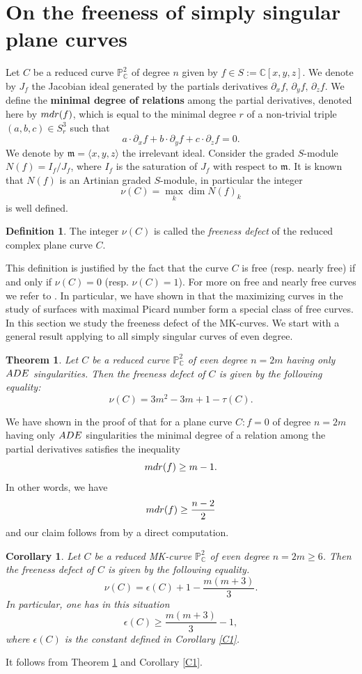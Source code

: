 \documentclass[11pt]{amsart}
\theoremstyle{plain}
\newtheorem{theorem}[thm]{Theorem}
\newtheorem{corollary}[thm]{Corollary}
\theoremstyle{definition}
\newtheorem{definition}[thm]{Definition}
\numberwithin{equation}{section}
\begin{document}
\section{On the freeness of simply singular plane curves}

 Let $C$ be a reduced curve $\mathbb{P}^{2}_{\mathbb{C}}$ of degree $n$ given by $f \in S :=\mathbb{C}[x,y,z]$. We denote by $J_{f}$ the Jacobian ideal generated by the partials derivatives $\partial_{x}f, \, \partial_{y}f, \, \partial_{z}f$. We define  the \textbf{minimal degree of relations} among the partial derivatives, denoted here by ${\rm mdr}(f)$, which is equal to the minimal degree $r$ of a non-trivial triple $(a,b,c) \in S_{r}^{3}$ such that 
$$a\cdot \partial_{x} f + b\cdot \partial_{y}f + c\cdot \partial_{z}f = 0.$$
We denote by $\mathfrak{m} = \langle x,y,z \rangle$ the irrelevant ideal. Consider the graded $S$-module $N(f) = I_{f} / J_{f}$, where $I_{f}$ is the saturation of $J_{f}$ with respect to $\mathfrak{m}$. It is known that $N(f)$ is an Artinian graded $S$-module, in particular the integer
$$\nu(C)=\max _k \dim N(f)_k$$
is well defined.
\begin{definition}
The integer $\nu(C)$ is called the {\it freeness defect} of the reduced complex plane curve $C$.
\end{definition}
This definition is justified by the fact that the curve $C$ is free (resp. nearly free) if and only if $\nu(C)=0$ (resp. $\nu(C)=1$). For more on free and nearly free curves we refer to \cite{DP,DimStic}. In particular, we have shown in  \cite[Theorem 2.9]{DP} that the maximizing curves in the study of surfaces with maximal Picard number form a special class of free curves.
In this section we study the freeness defect of the MK-curves. We start with a general result applying to all simply singular curves of even degree.
\begin{theorem}
\label{thmNU}
Let $C$ be a reduced curve $\mathbb{P}^{2}_{\mathbb{C}}$ of even degree $n=2m$ having only ${\rm ADE}$ singularities. Then the freeness defect of $C$ is given by the following equality:
$$\nu(C)= 3m^2-3m+1 -\tau (C).$$
\end{theorem}
\proof
We have shown in the proof of \cite[Theorem 2.9]{DP} that for a plane curve $C:f=0$ of degree $n=2m$ having only ${\rm ADE}$ singularities the minimal degree of a relation among the partial derivatives satisfies the inequality
$${\rm mdr}(f) \geq m-1.$$
In other words, we have
$${\rm mdr}(f) \geq \frac{n-2}{2}$$
and our claim follows from \cite[Theorem 1.2 (2)]{D_CMH} by a direct computation.
\endproof
\begin{corollary}
\label{corNU}
Let $C$ be a reduced MK-curve $\mathbb{P}^{2}_{\mathbb{C}}$ of even degree $n=2m\geq 6$. Then the freeness defect of $C$ is given by the following equality.
$$\nu(C)= \epsilon(C)+1-\frac{m(m+3)}{3}.$$
In particular, one has in this situation
$$\epsilon(C)\geq \frac{m(m+3)}{3}-1,$$
where $\epsilon(C)$ is the constant defined in Corollary \ref{C1}.
\end{corollary}
\proof It follows from Theorem \ref{thmNU} and Corollary \ref{C1}.
\endproof
\end{document}
